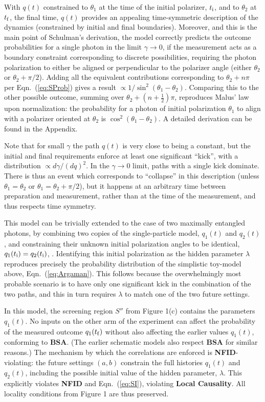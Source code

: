 \documentclass[onecolumn, nofootinbib, 12pt]{revtex4-1}
\newcommand{\eq}[1]{{Eqn.~(\ref{#1})}}
\begin{document}
With $q(t)$ constrained to $\theta_1$ at the time of the initial polarizer, $t_{\rm i}$, and to $\theta_2$ at $t_{\rm f}$, the final time, $q(t)$ provides an appealing time-symmetric description of the dynamics (constrained by initial and final boundaries).  Moreover, and this is the main point of Schulman's derivation, the model correctly predicts the outcome probabilities for a single photon in the limit $\gamma\to 0$, if the measurement acts as a boundary constraint corresponding to discrete possibilities, requiring the photon polarization to either be aligned or perpendicular to the polarizer angle (either $\theta_2$ or $\theta_2 + \pi/2$).  Adding all the equivalent contributions corresponding to $\theta_2 + n\pi$ per Eqn.~(\ref{eq:SProb}) gives a result $\propto 1/\sin^2(\theta_1-\theta_2)$. Comparing this to the other possible outcome, summing over $\theta_2 + (n+\frac{1}{2})\pi$, reproduces Malus' law upon normalization: the probability for a photon of initial polarization $\theta_1$ to align with a polarizer oriented at $\theta_2$ is $\cos^2(\theta_1-\theta_2)$.  A detailed derivation can be found in the Appendix.

Note that for small $\gamma$ the path $q(t)$ is very close to being a constant, but the initial and final requirements enforce at least one significant ``kick'', with a distribution $\propto d\gamma / (dq)^2$.  In the $\gamma\to 0$ limit, paths with a single kick dominate.  There is thus an event which corresponds to ``collapse'' in this description (unless $\theta_1=\theta_2$ or $\theta_1=\theta_2+\pi/2$), but it happens at an arbitrary time between preparation and measurement, rather than at the time of the measurement, and thus respects time symmetry.

This model can be trivially extended to the case of two maximally entangled photons, by combining two copies of the single-particle model, $q_1(t)$ and $q_2(t)$, and constraining their unknown initial polarization angles to be identical, $q_1(t_{\rm i}) = q_2(t_{\rm i})$, \cite{wharton2014, almada2016}.  Identifying this initial polarization as the hidden parameter $\lambda$ reproduces precisely the probability distribution of the simplistic toy-model above, \eq{eq:Argaman}.  This follows because the overwhelmingly most probable scenario is to have only one significant kick in the combination of the two paths, and this in turn requires $\lambda$ to match one of the two future settings.  

In this model, the screening region $S''$ from Figure 1(c) contains the parameters $q_1(t)$.  No inputs on the other arm of the experiment can affect the probability of the measured outcome $q_1(t_{\rm f})$ without also affecting the earlier values $q_1(t)$, conforming to {\bf BSA}.  (The earlier schematic models also respect {\bf BSA} for similar reasons.)
The mechanism by which the correlations are enforced is {{\bf NFID}-violating}: the future settings $(a,b)$ constrain the full histories $q_1(t)$ and $q_2(t)$, including the possible initial value of the hidden parameter, $\lambda$.  This explicitly violates {\bf NFID} and Eqn.~(\ref{eq:SI}), violating {\bf Local Causality}.  All locality conditions from Figure 1 are thus preserved. 
\end{document}
